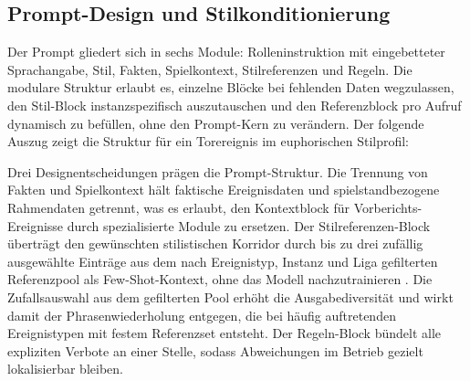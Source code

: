 \subsection{Prompt-Design und Stilkonditionierung}\label{prompt-design-stilkonditionierung}

Der Prompt gliedert sich in sechs Module: Rolleninstruktion mit eingebetteter Sprachangabe, Stil, Fakten, Spielkontext, Stilreferenzen und Regeln. Die modulare Struktur erlaubt es, einzelne Blöcke bei fehlenden Daten wegzulassen, den Stil-Block instanzspezifisch auszutauschen und den Referenzblock pro Aufruf dynamisch zu befüllen, ohne den Prompt-Kern zu verändern. Der folgende Auszug zeigt die Struktur für ein Torereignis im euphorischen Stilprofil:

\begin{Shaded}
\begin{Highlighting}[]




\end{Highlighting}
\end{Shaded}

Drei Designentscheidungen prägen die Prompt-Struktur. Die Trennung von Fakten und Spielkontext hält faktische Ereignisdaten und spielstandbezogene Rahmendaten getrennt, was es erlaubt, den Kontextblock für Vorberichts-Ereignisse durch spezialisierte Module zu ersetzen. Der Stilreferenzen-Block überträgt den gewünschten stilistischen Korridor durch bis zu drei zufällig ausgewählte Einträge aus dem nach Ereignistyp, Instanz und Liga gefilterten Referenzpool als Few-Shot-Kontext, ohne das Modell nachzutrainieren \cite{brown2020}. Die Zufallsauswahl aus dem gefilterten Pool erhöht die Ausgabediversität und wirkt damit der Phrasenwiederholung entgegen, die bei häufig auftretenden Ereignistypen mit festem Referenzset entsteht. Der Regeln-Block bündelt alle expliziten Verbote an einer Stelle, sodass Abweichungen im Betrieb gezielt lokalisierbar bleiben.

